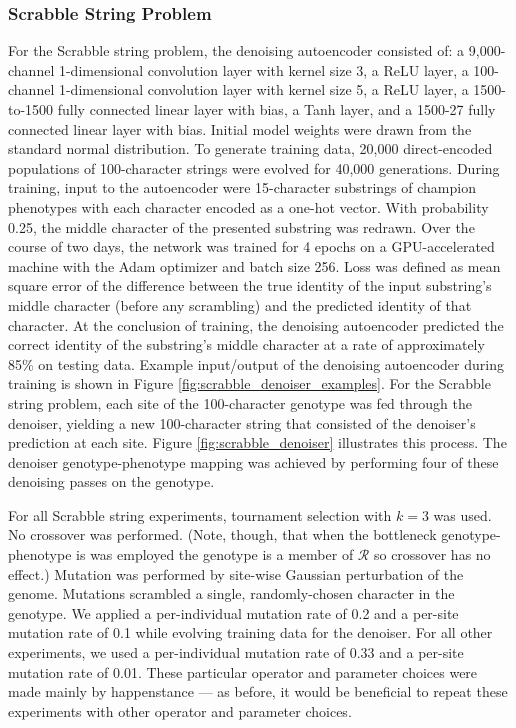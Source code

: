 \subsubsection{Scrabble String Problem}




For the Scrabble string problem, the denoising autoencoder consisted of: a 9,000-channel 1-dimensional convolution layer with kernel size 3, a ReLU layer, a 100-channel 1-dimensional convolution layer with kernel size 5, a ReLU layer, a 1500-to-1500 fully connected linear layer with bias, a Tanh layer, and a 1500-27 fully connected linear layer with bias.
Initial model weights were drawn from the standard normal distribution.
To generate training data, 20,000 direct-encoded populations of 100-character strings were evolved for 40,000 generations.
During training, input to the autoencoder were 15-character substrings of champion phenotypes with each character encoded as a one-hot vector.
With probability 0.25, the middle character of the presented substring was redrawn.
Over the course of two days, the network was trained for 4 epochs on a GPU-accelerated machine with the Adam optimizer and batch size 256.
Loss was defined as mean square error of the difference between the true identity of the input substring's middle character (before any scrambling) and the predicted identity of that character.
At the conclusion of training, the denoising autoencoder predicted the correct identity of the substring's middle character at a rate of approximately 85\% on testing data.
Example input/output of the denoising autoencoder during training is shown in Figure \ref{fig:scrabble_denoiser_examples}.
For the Scrabble string problem, each site of the 100-character genotype was fed through the denoiser, yielding a new 100-character string that consisted of the denoiser's prediction at each site.
Figure \ref{fig:scrabble_denoiser} illustrates this process.
The denoiser genotype-phenotype mapping was achieved by performing four of these denoising passes on the genotype.

For all Scrabble string experiments, tournament selection with $k = 3$ was used.
No crossover was performed.
(Note, though, that when the bottleneck genotype-phenotype is was employed the genotype is a member of $\mathcal{R}$ so crossover has no effect.)
Mutation was performed by site-wise Gaussian perturbation of the genome.
Mutations scrambled a single, randomly-chosen character in the genotype.
We applied a per-individual mutation rate of 0.2 and a per-site mutation rate of 0.1 while evolving training data for the denoiser.
For all other experiments, we used a per-individual mutation rate of 0.33 and a per-site mutation rate of 0.01.
These particular operator and parameter choices were made mainly by happenstance --- as before, it would be beneficial to repeat these experiments with other operator and parameter choices.

